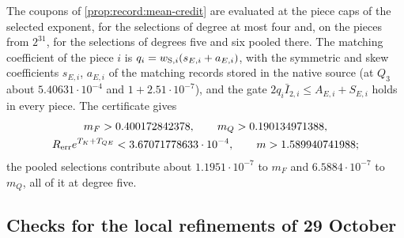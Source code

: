 \begin{certificate}\label{cert:record:means}
The coupons of \cref{prop:record:mean-credit} are evaluated at the piece caps
of the selected exponent, for the selections of degree at most four and, on the
pieces from $2^{31}$, for the selections of degrees five and six pooled there. The
matching coefficient of the piece $i$ is
$q_i=w_{{\rm S},i}(s_{E,i}+a_{E,i})$, with the symmetric and skew coefficients
$s_{E,i}$, $a_{E,i}$ of the matching records stored in the native source (at
$Q_3$ about $5.40631\cdot10^{-4}$ and $1+2.51\cdot10^{-7}$), and the gate
$2q_i\bar I_{2,i}\le A_{E,i}+S_{E,i}$ holds in every piece. The certificate
gives
\begin{gather*}
 m_F>0.400172842378,\qquad m_Q>0.190134971388,\\
 R_{\rm err}e^{T_K+T_{QE}}<3.67071778633\cdot10^{-4},\qquad
 m>1.589940741988 ;
\end{gather*}
the pooled selections contribute about $1.1951\cdot10^{-7}$ to $m_F$ and
$6.5884\cdot10^{-7}$ to $m_Q$, all of it at degree five.
\end{certificate}

\subsection{Checks for the local refinements of 29 October}
\label{subsec:cert:astra}

